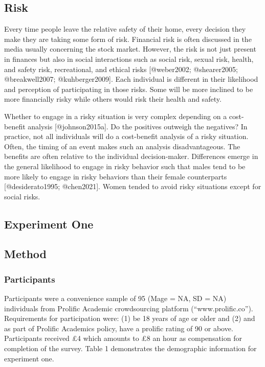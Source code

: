 \documentclass[
]{article}
\begin{document}
\hypertarget{risk}{%
\subsection{Risk}\label{risk}}

Every time people leave the relative safety of their home, every
decision they make they are taking some form of risk. Financial risk is
often discussed in the media usually concerning the stock market.
However, the risk is not just present in finances but also in social
interactions such as social risk, sexual risk, health, and safety risk,
recreational, and ethical risks {[}@weber2002; @shearer2005;
@breakwell2007; @kuhberger2009{]}. Each individual is different in their
likelihood and perception of participating in those risks. Some will be
more inclined to be more financially risky while others would risk their
health and safety.

Whether to engage in a risky situation is very complex depending on a
cost-benefit analysis {[}@johnson2015a{]}. Do the positives outweigh the
negatives? In practice, not all individuals will do a cost-benefit
analysis of a risky situation. Often, the timing of an event makes such
an analysis disadvantageous. The benefits are often relative to the
individual decision-maker. Differences emerge in the general likelihood
to engage in risky behavior such that males tend to be more likely to
engage in risky behaviors than their female counterparts
{[}@desiderato1995; @chen2021{]}. Women tended to avoid risky situations
except for social risks.

\hypertarget{experiment-one}{%
\subsection{Experiment One}\label{experiment-one}}

\hypertarget{method}{%
\subsection{Method}\label{method}}

\hypertarget{participants}{%
\subsubsection{Participants}\label{participants}}

Participants were a convenience sample of 95 (Mage = NA, SD = NA)
individuals from Prolific Academic crowdsourcing platform
(``www.prolific.co''). Requirements for participation were: (1) be 18
years of age or older and (2) and as part of Prolific Academics policy,
have a prolific rating of 90 or above. Participants received £4 which
amounts to £8 an hour as compensation for completion of the survey.
Table 1 demonstrates the demographic information for experiment one.
\end{document}
